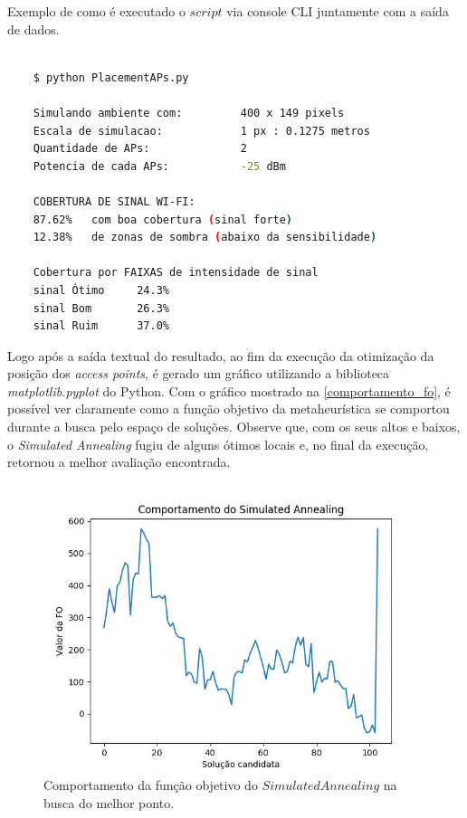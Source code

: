 \documentclass[
	12pt,				%
	twoside,			%
	a4paper,			%
	english,			%
	french,				%
	spanish,			%
	brazil				%
	]{abntex2}
\begin{document}
\begin{quadro}[!htb]
    \caption{\label{saida_exemplo} Exemplo de como é executado o $script$ via console CLI juntamente com a saída de dados. }

    \begin{lstlisting}[language=bash]
    
    $ python PlacementAPs.py 

    Simulando ambiente com:         400 x 149 pixels
    Escala de simulacao:            1 px : 0.1275 metros
    Quantidade de APs:              2
    Potencia de cada APs:           -25 dBm

    COBERTURA DE SINAL WI-FI:
    87.62%   com boa cobertura (sinal forte)
    12.38%   de zonas de sombra (abaixo da sensibilidade)

    Cobertura por FAIXAS de intensidade de sinal
    sinal Ótimo     24.3%
    sinal Bom       26.3%
    sinal Ruim      37.0%

    \end{lstlisting}
\end{quadro}

Logo após a saída textual do resultado, ao fim da execução da otimização
da posição dos \emph{access points}, é gerado um gráfico utilizando a
biblioteca \emph{matplotlib.pyplot} do Python. Com o gráfico mostrado na
\autoref{comportamento_fo}, é possível ver claramente como a função
objetivo da metaheurística se comportou durante a busca pelo espaço de
soluções. Observe que, com os seus altos e baixos, o \emph{Simulated
Annealing} fugiu de alguns ótimos locais e, no final da execução,
retornou a melhor avaliação encontrada.

\begin{figure}[!ht]
    \caption{\label{comportamento_fo} Comportamento da função objetivo do $Simulated Annealing$ na busca do melhor ponto.}
    \begin{center}
        \includegraphics[scale=0.4]{imagens/comportamento-fo.jpg}
    \end{center}
\end{figure}
\end{document}

